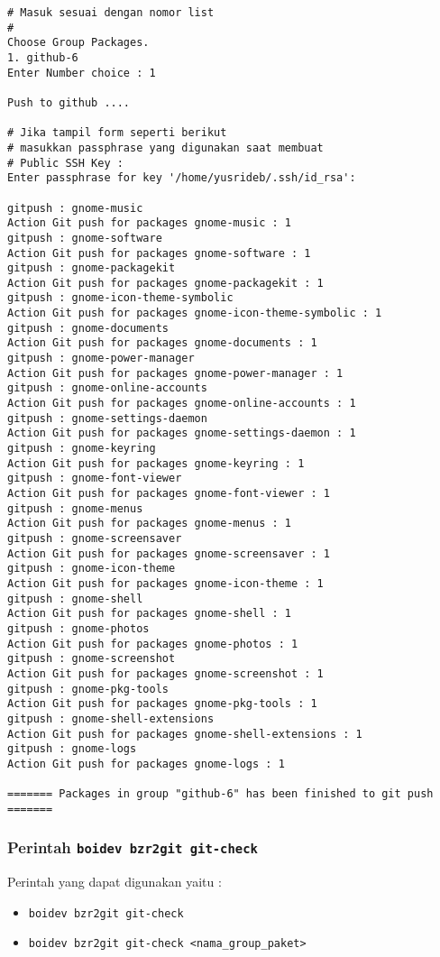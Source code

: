 {\begin{lstlisting}[language=ShellBash2]
# Masuk sesuai dengan nomor list
#
Choose Group Packages.
1. github-6
Enter Number choice : 1

Push to github .... 

# Jika tampil form seperti berikut
# masukkan passphrase yang digunakan saat membuat
# Public SSH Key :
Enter passphrase for key '/home/yusrideb/.ssh/id_rsa': 

gitpush : gnome-music
Action Git push for packages gnome-music : 1 
gitpush : gnome-software
Action Git push for packages gnome-software : 1 
gitpush : gnome-packagekit
Action Git push for packages gnome-packagekit : 1 
gitpush : gnome-icon-theme-symbolic
Action Git push for packages gnome-icon-theme-symbolic : 1 
gitpush : gnome-documents
Action Git push for packages gnome-documents : 1 
gitpush : gnome-power-manager
Action Git push for packages gnome-power-manager : 1 
gitpush : gnome-online-accounts
Action Git push for packages gnome-online-accounts : 1 
gitpush : gnome-settings-daemon
Action Git push for packages gnome-settings-daemon : 1 
gitpush : gnome-keyring
Action Git push for packages gnome-keyring : 1 
gitpush : gnome-font-viewer
Action Git push for packages gnome-font-viewer : 1 
gitpush : gnome-menus
Action Git push for packages gnome-menus : 1 
gitpush : gnome-screensaver
Action Git push for packages gnome-screensaver : 1 
gitpush : gnome-icon-theme
Action Git push for packages gnome-icon-theme : 1 
gitpush : gnome-shell
Action Git push for packages gnome-shell : 1 
gitpush : gnome-photos
Action Git push for packages gnome-photos : 1 
gitpush : gnome-screenshot
Action Git push for packages gnome-screenshot : 1 
gitpush : gnome-pkg-tools
Action Git push for packages gnome-pkg-tools : 1 
gitpush : gnome-shell-extensions
Action Git push for packages gnome-shell-extensions : 1 
gitpush : gnome-logs
Action Git push for packages gnome-logs : 1 

======= Packages in group "github-6" has been finished to git push =======
\end{lstlisting}

\subsubsection{Perintah {\small \texttt{boidev bzr2git git-check}}}
\noindent
Perintah yang dapat digunakan yaitu :
\begin{itemize}
	\item {\small \texttt{boidev bzr2git git-check}}
	\item {\small \texttt{boidev bzr2git git-check <nama\_group\_paket>}}
\end{itemize}

}
